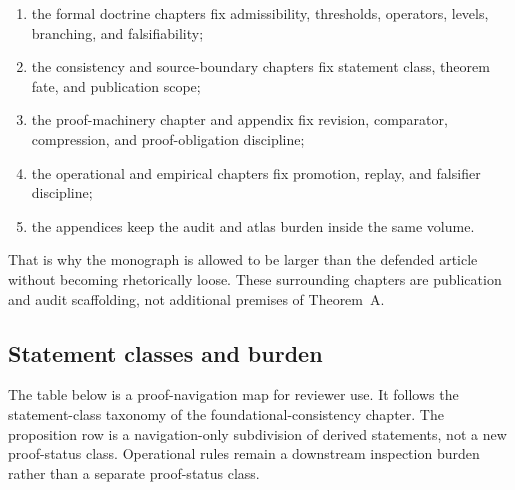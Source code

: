 \begin{enumerate}
\item the formal doctrine chapters fix admissibility, thresholds, operators,
      levels, branching, and falsifiability;
\item the consistency and source-boundary chapters fix statement class,
      theorem fate, and publication scope;
\item the proof-machinery chapter and appendix fix revision, comparator,
      compression, and proof-obligation discipline;
\item the operational and empirical chapters fix promotion, replay, and
      falsifier discipline;
\item the appendices keep the audit and atlas burden inside the same volume.
\end{enumerate}

That is why the monograph is allowed to be larger than the defended article
without becoming rhetorically loose. These surrounding chapters are publication
and audit scaffolding, not additional premises of Theorem~A.

\subsection{Statement classes and burden}

The table below is a proof-navigation map for reviewer use. It follows the
statement-class taxonomy of the foundational-consistency chapter.
The proposition row is a navigation-only subdivision of derived statements,
not a new proof-status class. Operational rules remain a downstream inspection
burden rather than a separate proof-status class.

